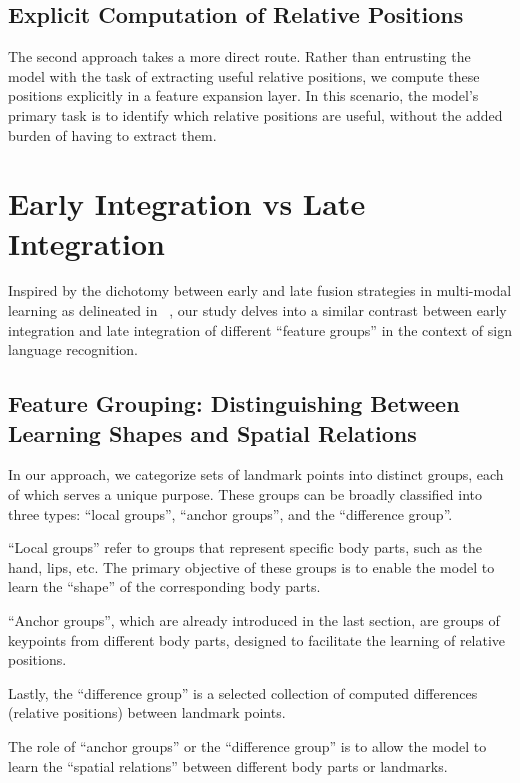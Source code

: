 \documentclass[10pt,twocolumn,letterpaper]{article}
\begin{document}
\begin{CJK*}{UTF8}{bsmi}
\subsection{Explicit Computation of Relative Positions}
The second approach takes a more direct route. Rather than entrusting the model with the task of extracting useful relative positions, we compute these positions explicitly in a feature expansion layer. In this scenario, the model’s primary task is to identify which relative positions are useful, without the added burden of having to extract them.
\section{Early Integration vs Late Integration}
Inspired by the dichotomy between early and late fusion strategies in multi-modal learning as delineated in ~\cite{Boulahia2021}, our study delves into a similar contrast between early integration and late integration of different “feature groups” in the context of sign language recognition.
\subsection{Feature Grouping: Distinguishing Between Learning Shapes and Spatial Relations}
In our approach, we categorize sets of landmark points into distinct groups, each of which serves a unique purpose. These groups can be broadly classified into three types: “local groups”, “anchor groups”, and the “difference group”.

“Local groups” refer to groups that represent specific body parts, such as the hand, lips, etc. The primary objective of these groups is to enable the model to learn the “shape” of the corresponding body parts.

“Anchor groups”, which are already introduced in the last section, are groups of keypoints from different body parts, designed to facilitate the learning of relative positions.

Lastly, the “difference group” is a selected collection of computed differences (relative positions) between landmark points.

The role of “anchor groups” or the “difference group” is to allow the model to learn the “spatial relations” between different body parts or landmarks.


\end{CJK*}
\end{document}

